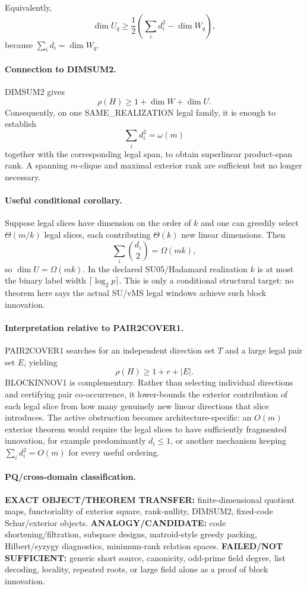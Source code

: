 \documentclass[11pt]{article}
\begin{document}
Equivalently,
\[
\boxed{
\dim U_q\ge
\frac12\left(\sum_i d_i^2-\dim W_q\right),
}
\]
because $\sum_i d_i=\dim W_q$.

\paragraph{Connection to DIMSUM2.}
DIMSUM2 gives
\[
\rho(H)\ge1+\dim W+\dim U.
\]
Consequently, on one SAME\_REALIZATION legal family, it is enough to establish
\[
\sum_i d_i^2=\omega(m)
\]
together with the corresponding legal span, to obtain superlinear product-span rank. A spanning $m$-clique and maximal exterior rank are sufficient but no longer necessary.

\paragraph{Useful conditional corollary.}
Suppose legal slices have dimension on the order of $k$ and one can greedily select $\Theta(m/k)$ legal slices, each contributing $\Theta(k)$ new linear dimensions. Then
\[
\sum_i\binom{d_i}{2}=\Omega(mk),
\]
so $\dim U=\Omega(mk)$. In the declared SU05/Hadamard realization $k$ is at most the binary label width $\lceil\log_2p\rceil$. This is only a conditional structural target: no theorem here says the actual SU/vMS legal windows achieve such block innovation.

\paragraph{Interpretation relative to PAIR2COVER1.}
PAIR2COVER1 searches for an independent direction set $T$ and a large legal pair set $E$, yielding
\[
\rho(H)\ge1+r+|E|.
\]
BLOCKINNOV1 is complementary. Rather than selecting individual directions and certifying pair co-occurrence, it lower-bounds the exterior contribution of each legal slice from how many genuinely new linear directions that slice introduces. The active obstruction becomes architecture-specific: an $O(m)$ exterior theorem would require the legal slices to have sufficiently fragmented innovation, for example predominantly $d_i\le1$, or another mechanism keeping $\sum_i d_i^2=O(m)$ for every useful ordering.

\paragraph{PQ/cross-domain classification.}
\textbf{EXACT OBJECT/THEOREM TRANSFER:} finite-dimensional quotient maps, functoriality of exterior square, rank-nullity, DIMSUM2, fixed-code Schur/exterior objects.
\textbf{ANALOGY/CANDIDATE:} code shortening/filtration, subspace designs, matroid-style greedy packing, Hilbert/syzygy diagnostics, minimum-rank relation spaces.
\textbf{FAILED/NOT SUFFICIENT:} generic short source, canonicity, odd-prime field degree, list decoding, locality, repeated roots, or large field alone as a proof of block innovation.
\end{document}
